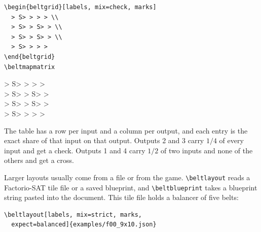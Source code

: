 \documentclass[11pt]{article}
\newcommand\cs[1]{\texttt{\textbackslash#1}}
\begin{document}
	\begin{minipage}[c]{0.6\linewidth}
		\begin{Verbatim}
\begin{beltgrid}[labels, mix=check, marks]
  > S> > > > \\
  > S> > S> > \\
  > S> > S> > \\
  > S> > > >
\end{beltgrid}
\beltmapmatrix
		\end{Verbatim}
	\end{minipage}\hfill
	\begin{minipage}[c]{0.36\linewidth}
		\centering
		\begin{beltgrid}[labels, mix=check, marks, tile=5mm, expect=unbalanced]
			> S> > > > \\
			> S> > S> > \\
			> S> > S> > \\
			> S> > > >
		\end{beltgrid}

		\medskip
		\beltmapmatrix
	\end{minipage}

	The table has a row per input and a column per output, and each entry is the exact share of that input on that output. Outputs 2 and 3 carry $1/4$ of every input and get a check. Outputs 1 and 4 carry $1/2$ of two inputs and none of the others and get a cross.

	Larger layouts usually come from a file or from the game. \cs{beltlayout} reads a Factorio-SAT tile file or a saved blueprint, and \cs{beltblueprint} takes a blueprint string pasted into the document. This tile file holds a balancer of five belts:

	\par\noindent
	\begin{minipage}[c]{0.6\linewidth}
		\begin{Verbatim}
\beltlayout[labels, mix=strict, marks,
  expect=balanced]{examples/f00_9x10.json}
		\end{Verbatim}
	\end{minipage}\hfill
	\begin{minipage}[c]{0.36\linewidth}
		\centering
	\end{minipage}
\end{document}
